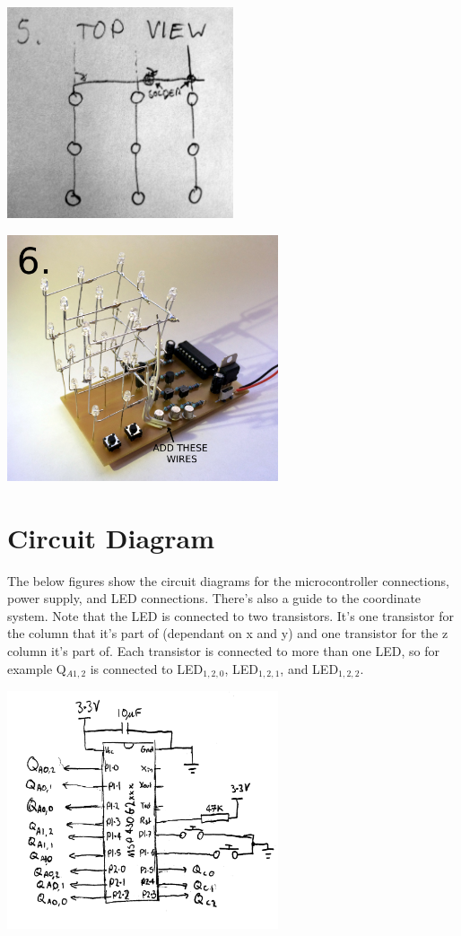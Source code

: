 \documentclass{article}
\begin{document}
\centerline{
\includegraphics[width=0.5\textwidth]{s5.png}
}

\centerline{
\includegraphics[width=0.6\textwidth]{s6.JPG}
}

\section{Circuit Diagram}

The below figures show the circuit diagrams for the microcontroller 
connections, power supply, and LED connections. There's also a guide to 
the coordinate system. Note that the LED is connected to two transistors. 
It's one transistor for the column that it's part of (dependant on x 
and y) and one transistor for the z column it's part of. Each transistor
is connected to more than one LED, so for example Q$_{A1,2}$ is 
connected to LED$_{1,2,0}$, LED$_{1,2,1}$, and LED$_{1,2,2}$.

\centerline{
\includegraphics[width=0.6\textwidth]{mcu.JPG}
}
\end{document}
